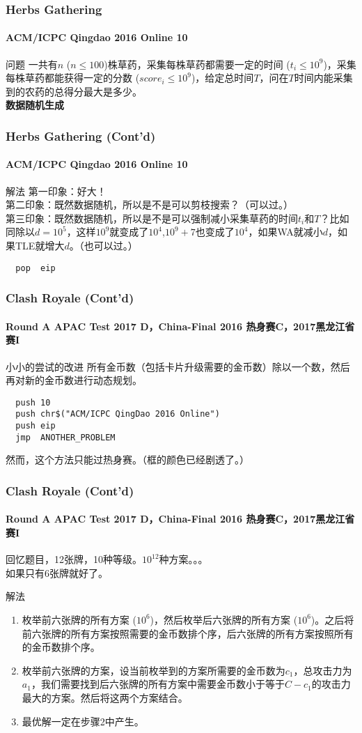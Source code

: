 \documentclass[hyperref={unicode=true}]{beamer}
\begin{document}
  \begin{frame}\frametitle{Herbs Gathering}
    \framesubtitle{ACM/ICPC Qingdao 2016 Online 10}
    \begin{block}{问题}
      一共有$n$ ($n\leq100$)株草药，采集每株草药都需要一定的时间 ($t_i\leq10^9$)，采集每株草药都能获得一定的分数 ($score_i\leq10^9$)，给定总时间$T$，问在$T$时间内能采集到的农药的总得分最大是多少。\\
      {\bf 数据随机生成}
    \end{block}
  \end{frame}
  \begin{frame}[fragile]\frametitle{Herbs Gathering (Cont'd)}
    \framesubtitle{ACM/ICPC Qingdao 2016 Online 10}
    \begin{exampleblock}{解法}
      第一印象：好大！\\
      第二印象：既然数据随机，所以是不是可以剪枝搜索？（可以过。）\\
      第三印象：既然数据随机，所以是不是可以强制减小采集草药的时间$t_i$和$T$？比如同除以$d=10^5$，这样$10^9$就变成了$10^4$,$10^9+7$也变成了$10^4$，如果WA就减小$d$，如果TLE就增大$d$。（也可以过。）
      \begin{verbatim}
  pop  eip
      \end{verbatim}
    \end{exampleblock}
  \end{frame}
  \begin{frame}[fragile]\frametitle{Clash Royale (Cont'd)}
    \framesubtitle{Round A APAC Test 2017 D，China-Final 2016 热身赛C，2017黑龙江省赛I}
    \begin{alertblock}{小小的尝试的改进}
      所有金币数（包括卡片升级需要的金币数）除以一个数，然后再对新的金币数进行动态规划。\\
      \begin{verbatim}
  push 10
  push chr$("ACM/ICPC QingDao 2016 Online")
  push eip
  jmp  ANOTHER_PROBLEM
      \end{verbatim}
      然而，这个方法只能过热身赛。（框的颜色已经剧透了。）
    \end{alertblock}
  \end{frame}
  \begin{frame}[fragile]\frametitle{Clash Royale (Cont'd)}
    \framesubtitle{Round A APAC Test 2017 D，China-Final 2016 热身赛C，2017黑龙江省赛I}
    回忆题目，12张牌，10种等级。$10^{12}$种方案。。。\\
    如果只有6张牌就好了。
    \pause\begin{exampleblock}{解法}
    \begin{enumerate}[1.]
    \item 枚举前六张牌的所有方案 ($10^6$)，然后枚举后六张牌的所有方案 ($10^6$)。之后将前六张牌的所有方案按照需要的金币数排个序，后六张牌的所有方案按照所有的金币数排个序。\\
    \item 枚举前六张牌的方案，设当前枚举到的方案所需要的金币数为$c_1$，总攻击力为$a_1$，我们需要找到后六张牌的所有方案中需要金币数小于等于$C-c_1$的攻击力最大的方案。然后将这两个方案结合。
    \item 最优解一定在步骤2中产生。
    \end{enumerate}
    \end{exampleblock}
  \end{frame}
\end{document}
